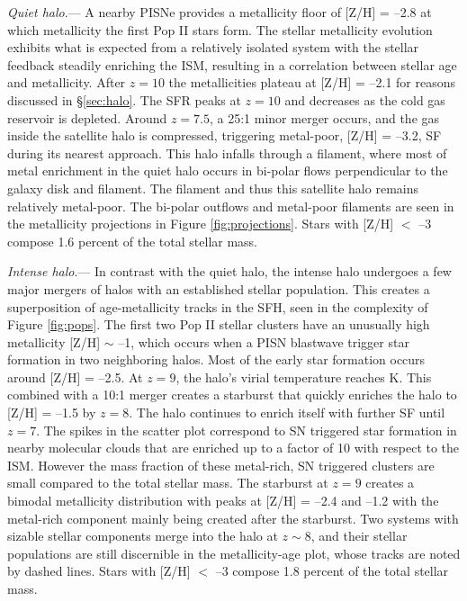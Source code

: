 \documentclass[apjl]{emulateapj}
\begin{document}
\textit{Quiet halo}.--- A nearby PISNe provides a metallicity floor of
[Z/H] = --2.8 at which metallicity the first Pop II stars form.  The
stellar metallicity evolution exhibits what is expected from a
relatively isolated system with the stellar feedback steadily
enriching the ISM, resulting in a correlation between stellar age and
metallicity.  After $z=10$ the metallicities plateau at [Z/H] = --2.1
for reasons discussed in \S\ref{sec:halo}.  The SFR peaks at $z=10$
and decreases as the cold gas reservoir is depleted.  Around $z=7.5$,
a 25:1 minor merger occurs, and the gas inside the satellite halo is
compressed, triggering metal-poor, [Z/H] = --3.2, SF during its
nearest approach.  This halo infalls through a filament, where most of
metal enrichment in the quiet halo occurs in bi-polar flows
perpendicular to the galaxy disk and filament.  The filament and thus
this satellite halo remains relatively metal-poor.  The bi-polar
outflows and metal-poor filaments are seen in the metallicity
projections in Figure \ref{fig:projections}.  Stars with [Z/H] $<$ --3
compose 1.6 percent of the total stellar mass.
       
\textit{Intense halo}.--- In contrast with the quiet halo, the intense
halo undergoes a few major mergers of halos with an established
stellar population.  This creates a superposition of age-metallicity
tracks in the SFH, seen in the complexity of Figure \ref{fig:pops}.
The first two Pop II stellar clusters have an unusually high
metallicity [Z/H] $\sim$ --1, which occurs when a PISN blastwave
trigger star formation in two neighboring halos.  Most of the early
star formation occurs around [Z/H] = --2.5.  At $z=9$, the halo's
virial temperature reaches  K.  This combined with a 10:1
merger creates a starburst that quickly enriches the halo to [Z/H] =
--1.5 by $z=8$.  The halo continues to enrich itself with further SF
until $z=7$.  The spikes in the scatter plot correspond to SN
triggered star formation in nearby molecular clouds that are enriched
up to a factor of 10 with respect to the ISM.  However the mass
fraction of these metal-rich, SN triggered clusters are small compared
to the total stellar mass.  The starburst at $z=9$ creates a bimodal
metallicity distribution with peaks at [Z/H] = --2.4 and --1.2 with
the metal-rich component mainly being created after the starburst.
Two systems with sizable stellar components merge into the halo at $z
\sim 8$, and their stellar populations are still discernible in the
metallicity-age plot, whose tracks are noted by dashed lines.  Stars
with [Z/H] $<$ --3 compose 1.8 percent of the total stellar mass.
\end{document}
